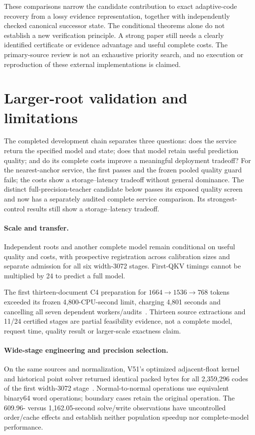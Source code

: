 \documentclass[10pt,twocolumn,letterpaper]{article}
\begin{document}
These comparisons narrow the candidate contribution to exact adaptive-code
recovery from a lossy evidence representation, together with independently
checked canonical successor state. The conditional theorems alone do not
establish a new verification principle. A strong paper still needs a clearly
identified certificate or evidence advantage and useful complete costs. The
primary-source review is not an exhaustive priority search, and no execution or
reproduction of these external implementations is claimed.

\section{Larger-root validation and limitations}
The completed development chain separates three questions: does the service
return the specified model and state; does that model retain useful prediction
quality; and do its complete costs improve a meaningful deployment tradeoff?
For the nearest-anchor service, the first passes and the frozen pooled quality
guard fails; the costs show a storage--latency tradeoff without general dominance.
The distinct full-precision-teacher candidate below passes its exposed quality
screen and now has a separately audited complete service comparison. Its
strongest-control results still show a storage--latency tradeoff.

\paragraph{Scale and transfer.}
Independent roots and another complete model remain conditional on useful
quality and costs, with prospective registration across calibration sizes and
separate admission for all six width-3072 stages. First-QKV timings cannot be
multiplied by 24 to predict a full model.

The first thirteen-document C4 preparation for $1664\to1536\to768$ tokens
exceeded its frozen 4,800-CPU-second limit, charging 4,801 seconds and cancelling
all seven dependent workers/audits~\cite{v49failure}. Thirteen source extractions
and 11/24 certified stages are partial feasibility evidence, not a complete
model, request time, quality result or larger-scale exactness claim.

\paragraph{Wide-stage engineering and precision selection.}
On the same sources and normalization, V51's optimized adjacent-float kernel
and historical point solver returned identical packed bytes for all 2,359,296
codes of the first width-3072 stage~\cite{v51}. Normal-to-normal operations use
equivalent binary64 word operations; boundary cases retain the original operation.
The 609.96- versus 1,162.05-second solve/write observations have uncontrolled
order/cache effects and establish neither population speedup nor complete-model
performance.
\end{document}
